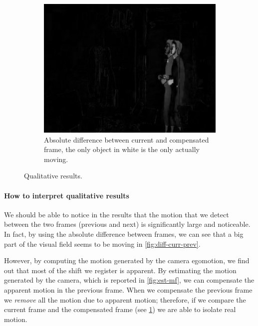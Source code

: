\begin{figure}[!h]
    \hfill
    \begin{subfigure}[b]{0.3\textwidth}
        \includegraphics[width=1\textwidth]{../assets/images/04-diff-curr-comp.png}
        \caption{Absolute difference between current and compensated frame, the only object in white is the only actually moving.}
        \label{fig:diff-curr-comp}
    \end{subfigure}

    \caption{Qualitative results.}
    \label{fig:qualitative-results}
\end{figure}

\paragraph{How to interpret qualitative results} We should be able to notice in the results that the motion that we detect between the two frames (previous and next) is significantly large and noticeable. In fact, by using the absolute difference between frames, we can see that a big part of the visual field seems to be moving in \cref{fig:diff-curr-prev}.

However, by computing the motion generated by the camera egomotion, we find out that most of the shift we register is apparent.
By estimating the motion generated by the camera, which is reported in  \cref{fig:est-mf}, we can compensate the apparent motion in the previous frame.
When we compensate the previous frame we \textit{remove} all the motion due to apparent motion; therefore, if we compare the current frame and the compensated frame (see \cref{fig:diff-curr-comp}) we are able to isolate real motion.


